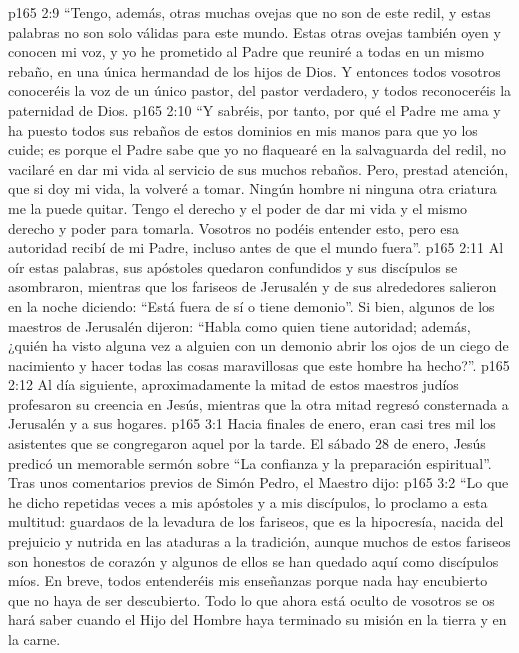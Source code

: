 \vs p165 2:9 “Tengo, además, otras muchas ovejas que no son de este redil, y estas palabras no son solo válidas para este mundo. Estas otras ovejas también oyen y conocen mi voz, y yo he prometido al Padre que reuniré a todas en un mismo rebaño, en una única hermandad de los hijos de Dios. Y entonces todos vosotros conoceréis la voz de un único pastor, del pastor verdadero, y todos reconoceréis la paternidad de Dios.
\vs p165 2:10 “Y sabréis, por tanto, por qué el Padre me ama y ha puesto todos sus rebaños de estos dominios en mis manos para que yo los cuide; es porque el Padre sabe que yo no flaquearé en la salvaguarda del redil, no vacilaré en dar mi vida al servicio de sus muchos rebaños. Pero, prestad atención, que si doy mi vida, la volveré a tomar. Ningún hombre ni ninguna otra criatura me la puede quitar. Tengo el derecho y el poder de dar mi vida y el mismo derecho y poder para tomarla. Vosotros no podéis entender esto, pero esa autoridad recibí de mi Padre, incluso antes de que el mundo fuera”.
\vs p165 2:11 \pc Al oír estas palabras, sus apóstoles quedaron confundidos y sus discípulos se asombraron, mientras que los fariseos de Jerusalén y de sus alrededores salieron en la noche diciendo: “Está fuera de sí o tiene demonio”. Si bien, algunos de los maestros de Jerusalén dijeron: “Habla como quien tiene autoridad; además, ¿quién ha visto alguna vez a alguien con un demonio abrir los ojos de un ciego de nacimiento y hacer todas las cosas maravillosas que este hombre ha hecho?”.
\vs p165 2:12 Al día siguiente, aproximadamente la mitad de estos maestros judíos profesaron su creencia en Jesús, mientras que la otra mitad regresó consternada a Jerusalén y a sus hogares.
\vs p165 3:1 Hacia finales de enero, eran casi tres mil los asistentes que se congregaron aquel  por la tarde. El sábado 28 de enero, Jesús predicó un memorable sermón sobre “La confianza y la preparación espiritual”. Tras unos comentarios previos de Simón Pedro, el Maestro dijo:
\vs p165 3:2 \pc “Lo que he dicho repetidas veces a mis apóstoles y a mis discípulos, lo proclamo a esta multitud: guardaos de la levadura de los fariseos, que es la hipocresía, nacida del prejuicio y nutrida en las ataduras a la tradición, aunque muchos de estos fariseos son honestos de corazón y algunos de ellos se han quedado aquí como discípulos míos. En breve, todos entenderéis mis enseñanzas porque nada hay encubierto que no haya de ser descubierto. Todo lo que ahora está oculto de vosotros se os hará saber cuando el Hijo del Hombre haya terminado su misión en la tierra y en la carne.
